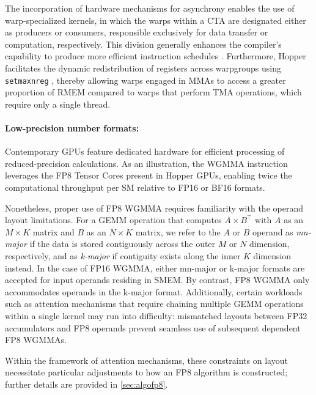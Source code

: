 The incorporation of hardware mechanisms for asynchrony enables the use of warp-specialized kernels, in which the warps within a CTA are designated either as producers or consumers, responsible exclusively for data transfer or computation, respectively. This division generally enhances the compiler's capability to produce more efficient instruction schedules \citep{warp-specialization-2011}. Furthermore, Hopper facilitates the dynamic redistribution of registers across warpgroups using \verb|setmaxnreg| \cite[\S9.7.17.1]{ptx}, thereby allowing warps engaged in MMAs to access a greater proportion of RMEM compared to warps that perform TMA operations, which require only a single thread.

\paragraph{Low-precision number formats:}
\label{sec:low-precision-gpu}
Contemporary GPUs feature dedicated hardware for efficient processing of reduced-precision calculations. As an illustration, the WGMMA instruction leverages the FP8 Tensor Cores present in Hopper GPUs, enabling twice the computational throughput per SM relative to FP16 or BF16 formats.

Nonetheless, proper use of FP8 WGMMA requires familiarity with the operand layout limitations. For a GEMM operation that computes $A \times B^{\top}$ with $A$ as an $M\times K$ matrix and $B$ as an $N\times K$ matrix, we refer to the $A$ or $B$ operand as \emph{mn-major} if the data is stored contiguously across the outer $M$ or $N$ dimension, respectively, and as \emph{k-major} if contiguity exists along the inner $K$ dimension instead. In the case of FP16 WGMMA, either mn-major or k-major formats are accepted for input operands residing in SMEM. By contrast, FP8 WGMMA only accommodates operands in the k-major format. Additionally, certain workloads such as attention mechanisms that require chaining multiple GEMM operations within a single kernel may run into difficulty: mismatched layouts between FP32 accumulators and FP8 operands prevent seamless use of subsequent dependent FP8 WGMMAs.

Within the framework of attention mechanisms, these constraints on layout necessitate particular adjustments to how an FP8 algorithm is constructed; further details are provided in \cref{sec:algofp8}.

